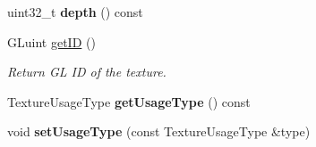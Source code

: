 \begin{Indent}
\begin{DoxyCompactItemize}
uint32\+\_\+t {\bfseries depth} () const
\item 
\mbox{\label{classrev_1_1_texture_abdae8735cccb4f5f071312f7bcd5fab9}} 
G\+Luint \mbox{\hyperlink{classrev_1_1_texture_abdae8735cccb4f5f071312f7bcd5fab9}{get\+ID}} ()
\begin{DoxyCompactList}\small\item\em Return GL ID of the texture. \end{DoxyCompactList}\item 
\mbox{\label{classrev_1_1_texture_ad9a85dedd1ec52b99f396c7eeb20d234}} 
Texture\+Usage\+Type {\bfseries get\+Usage\+Type} () const
\item 
\mbox{\label{classrev_1_1_texture_adc17f7521dd4f082c9eeebc3b7ce9df9}} 
void {\bfseries set\+Usage\+Type} (const Texture\+Usage\+Type \&type)
\end{DoxyCompactItemize}
\end{Indent}

